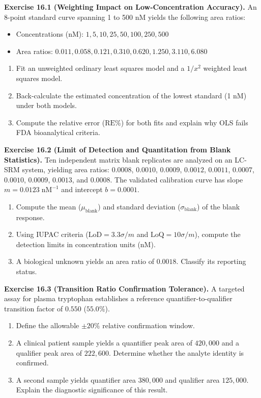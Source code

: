 \documentclass[11pt,twoside,openright]{book}
\begin{document}
\noindent\textbf{Exercise 16.1 (Weighting Impact on Low-Concentration Accuracy).}\enspace
\label{ex:ols_vs_wls}
An 8-point standard curve spanning 1 to 500 nM yields the following area ratios:
\begin{itemize}
    \item Concentrations (nM): $1, 5, 10, 25, 50, 100, 250, 500$
    \item Area ratios: $0.011, 0.058, 0.121, 0.310, 0.620, 1.250, 3.110, 6.080$
\end{itemize}
\begin{enumerate}
    \item Fit an unweighted ordinary least squares model and a $1/x^2$ weighted least squares model.
    \item Back-calculate the estimated concentration of the lowest standard (1 nM) under both models.
    \item Compute the relative error ($\text{RE}\%$) for both fits and explain why OLS fails FDA bioanalytical criteria.
\end{enumerate}

\vspace{0.8em}
\noindent\textbf{Exercise 16.2 (Limit of Detection and Quantitation from Blank Statistics).}\enspace
\label{ex:lod_loq_blanks}
Ten independent matrix blank replicates are analyzed on an LC-SRM system, yielding area ratios:
$0.0008$, $0.0010$, $0.0009$, $0.0012$, $0.0011$, $0.0007$, $0.0010$, $0.0009$, $0.0013$, and $0.0008$.
The validated calibration curve has slope $m = 0.0123\;\text{nM}^{-1}$ and intercept $b = 0.0001$.
\begin{enumerate}
    \item Compute the mean ($\mu_{\text{blank}}$) and standard deviation ($\sigma_{\text{blank}}$) of the blank response.
    \item Using IUPAC criteria ($\text{LoD} = 3.3 \sigma / m$ and $\text{LoQ} = 10 \sigma / m$), compute the detection limits in concentration units (nM).
    \item A biological unknown yields an area ratio of $0.0018$. Classify its reporting status.
\end{enumerate}

\vspace{0.8em}
\noindent\textbf{Exercise 16.3 (Transition Ratio Confirmation Tolerance).}\enspace
\label{ex:transition_ratio_audit}
A targeted assay for plasma tryptophan establishes a reference quantifier-to-qualifier transition factor of $0.550$ ($55.0\%$).
\begin{enumerate}
    \item Define the allowable $\pm 20\%$ relative confirmation window.
    \item A clinical patient sample yields a quantifier peak area of $420,000$ and a qualifier peak area of $222,600$. Determine whether the analyte identity is confirmed.
    \item A second sample yields quantifier area $380,000$ and qualifier area $125,000$. Explain the diagnostic significance of this result.
\end{enumerate}
\end{document}

